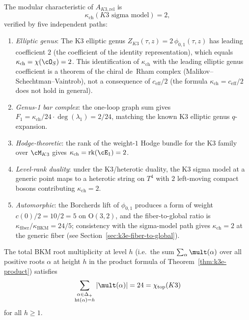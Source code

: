 \begin{theorem}
\label{thm:k3-kappa}
\ClaimStatusProvedHere
The modular characteristic of $A_{K3,\mathrm{rel}}$ is
\[
 \kappa_{\mathrm{ch}}(K3\text{ sigma model}) = 2,
\]
verified by five independent paths:
\begin{enumerate}[label=(\alph*)]
 \item \emph{Elliptic genus}: The K3 elliptic genus $Z_{K3}(\tau,z) = 2\,\phi_{0,1}(\tau,z)$ has leading coefficient $2$ (the coefficient of the identity representation), which equals $\kappa_{\mathrm{ch}} = \chi(\cO_S) = 2$. This identification of $\kappa_{\mathrm{ch}}$ with the leading elliptic genus coefficient is a theorem of the chiral de~Rham complex (Malikov--Schechtman--Vaintrob), not a consequence of $c_{\mathrm{eff}}/2$ (the formula $\kappa_{\mathrm{ch}} = c_{\mathrm{eff}}/2$ does not hold in general).
 \item \emph{Genus-1 bar complex}: the one-loop graph sum gives $F_1 = \kappa_{\mathrm{ch}}/24 \cdot \deg(\lambda_1) = 2/24$, matching the known K3 elliptic genus $q$-expansion.
 \item \emph{Hodge-theoretic}: the rank of the weight-$1$ Hodge bundle for the K3 family over $\cM_{K3}$ gives $\kappa_{\mathrm{ch}} = \mathrm{rk}(\cE_1) = 2$.
 \item \emph{Level-rank duality}: under the K3/heterotic duality, the K3 sigma model at a generic point maps to a heterotic string on $T^4$ with $2$ left-moving compact bosons contributing $\kappa_{\mathrm{ch}} = 2$.
 \item \emph{Automorphic}: the Borcherds lift of $\phi_{0,1}$ produces a form of weight $c(0)/2 = 10/2 = 5$ on $\mathrm{O}(3,2)$, and the fiber-to-global ratio is $\kappa_{\mathrm{fiber}}/\kappa_{\mathrm{BKM}} = 24/5$; consistency with the sigma-model path gives $\kappa_{\mathrm{ch}} = 2$ at the generic fiber (see Section~\ref{sec:k3e-fiber-to-global}).
\end{enumerate}
\ClaimStatusProvedHere
\end{theorem}

\begin{proposition}
\label{prop:k3e-total-mult}
The total BKM root multiplicity at level $h$ (i.e.\ the sum $\sum_\alpha \mult(\alpha)$ over all positive roots $\alpha$ at height $h$ in the product formula of Theorem~\ref{thm:k3e-product}) satisfies
\[
 \sum_{\substack{\alpha \in \Delta_+ \\ \mathrm{ht}(\alpha) = h}} |\mult(\alpha)| = 24 = \chi_{\mathrm{top}}(K3)
\]
for all $h \geq 1$.
\ClaimStatusProvedHere
\end{proposition}

